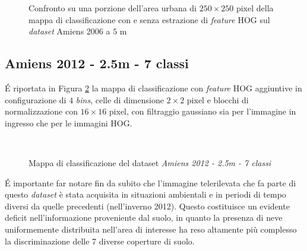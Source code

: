  \begin{figure}[!ht]
 \center
\hspace{2mm}      
    \caption{Confronto su una porzione dell'area urbana di $250\times250$ pixel della mappa di classificazione con e senza estrazione di \emph{feature} HOG sul \emph{dataset} Amiens 2006 a $5$ m}
    \label{fig:confrontoAmiens2006_5m}
  \end{figure}


\clearpage


\subsection{Amiens 2012 - 2.5m - 7 classi}
\'E riportata in Figura \ref{fig:ClassMap_Amiens2012_2_5m_noroads} la mappa di classificazione con \emph{feature} HOG aggiuntive in configurazione di $4$ \emph{bins}, celle di dimensione $2\times2$ pixel e blocchi di normalizzazione con $16\times16$ pixel, con filtraggio gaussiano sia per l'immagine in ingresso che per le immagini HOG.
\begin{figure}[!ht]
 \center
      \\
     
    \caption{Mappa di classificazione del dataset \emph{Amiens 2012 - 2.5m - 7 classi}}
    \label{fig:ClassMap_Amiens2012_2_5m_noroads}
  \end{figure} 

\'E importante far notare fin da subito che l'immagine telerilevata che fa parte di questo \emph{dataset} è stata acquisita in situazioni ambientali e in periodi di tempo diversi da quelle precedenti (nell'inverno 2012). Questo costituisce un evidente deficit nell'informazione proveniente dal suolo, in quanto la presenza di neve uniformemente distribuita nell'area di interesse ha reso altamente più complesso la discriminazione delle 7 diverse coperture di suolo.\\

